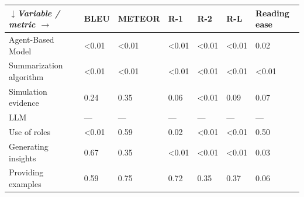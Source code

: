 \begin{tabular}{|l|l|l|l|l|l|l|}
\hline
\textit{$\downarrow$Variable / metric $\rightarrow$} & BLEU & METEOR & R-1 & R-2 & R-L & Reading ease \\
 \hline
 Agent-Based Model & \textless{}0.01 & \textless{}0.01 & \textless{}0.01 & \textless{}0.01 & \textless{}0.01 & 0.02 \\
 \hline
 Summarization algorithm & \textless{}0.01 & \textless{}0.01 & \textless{}0.01 & \textless{}0.01 & \textless{}0.01 & \textless{}0.01 \\
 \hline
 Simulation evidence & 0.24 & 0.35 & 0.06 & \textless{}0.01 & 0.09 & 0.07 \\
 \hline
 LLM & — & — & — & — & — & — \\
 \hline
 Use of roles & \textless{}0.01 & 0.59 & 0.02 & \textless{}0.01 & \textless{}0.01 & 0.50 \\
 \hline
 Generating insights & 0.67 & 0.35 & \textless{}0.01 & \textless{}0.01 & \textless{}0.01 & 0.03 \\
 \hline
 Providing examples & 0.59 & 0.75 & 0.72 & 0.35 & 0.37 & 0.06 \\
\hline
\end{tabular}
